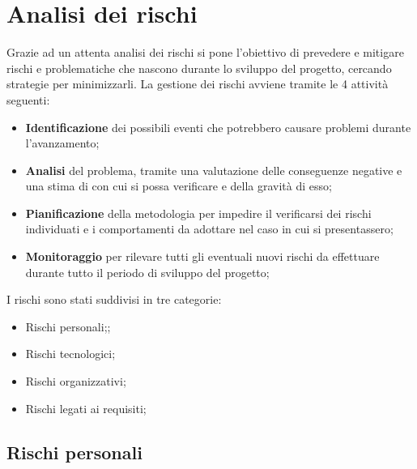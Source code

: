 \section{Analisi dei rischi}

Grazie ad un attenta analisi dei rischi si pone l'obiettivo di prevedere e mitigare rischi e problematiche che nascono durante lo sviluppo del progetto, cercando strategie per minimizzarli. 
La gestione dei rischi avviene tramite le 4 attività seguenti:
\begin{itemize}
	\item \textbf{Identificazione} dei possibili eventi che potrebbero causare problemi durante l'avanzamento;
	\item \textbf{Analisi} del problema, tramite una valutazione delle conseguenze negative e una stima di con cui si possa verificare e della gravità di esso;
	\item \textbf{Pianificazione} della metodologia per impedire il verificarsi dei rischi individuati e i comportamenti da adottare nel caso in cui si presentassero;
	\item \textbf{Monitoraggio} per rilevare tutti gli eventuali nuovi rischi da effettuare durante tutto il periodo di sviluppo del progetto;
\end{itemize}

I rischi sono stati suddivisi in tre categorie:
\begin{itemize}
	\item Rischi personali;;
	\item Rischi tecnologici;
	\item Rischi organizzativi;
	\item Rischi legati ai requisiti;
\end{itemize}

\subsection{Rischi personali}

